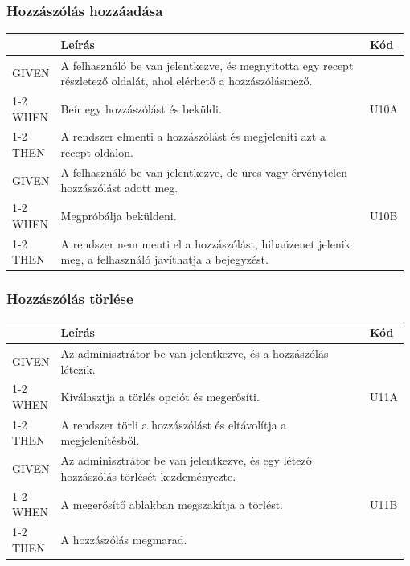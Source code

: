 \subsubsection{Hozzászólás hozzáadása}
\begin{table}[H]
	\centering
	\begin{tabular}{|m{0.12\linewidth}|m{0.78\linewidth}|m{0.08\linewidth}|}
		\hline
		& \textbf{Leírás} & \textbf{Kód} \\\hline
		GIVEN & A felhasználó be van jelentkezve, és megnyitotta egy recept részletező oldalát, ahol elérhető a hozzászólásmező. & \multirow{3}{*}{U10A} \\\cline{1-2}
		WHEN  & Beír egy hozzászólást és beküldi. & \\\cline{1-2}
		THEN  & A rendszer elmenti a hozzászólást és megjeleníti azt a recept oldalon. & \\\hline

		GIVEN & A felhasználó be van jelentkezve, de üres vagy érvénytelen hozzászólást adott meg. & \multirow{3}{*}{U10B} \\\cline{1-2}
		WHEN  & Megpróbálja beküldeni. & \\\cline{1-2}
		THEN  & A rendszer nem menti el a hozzászólást, hibaüzenet jelenik meg, a felhasználó javíthatja a bejegyzést. & \\\hline
	\end{tabular}
\end{table}

\subsubsection{Hozzászólás törlése}
\begin{table}[H]
	\centering
	\begin{tabular}{|m{0.12\linewidth}|m{0.78\linewidth}|m{0.08\linewidth}|}
		\hline
		& \textbf{Leírás} & \textbf{Kód} \\\hline
		GIVEN & Az adminisztrátor be van jelentkezve, és a hozzászólás létezik. & \multirow{3}{*}{U11A} \\\cline{1-2}
		WHEN  & Kiválasztja a törlés opciót és megerősíti. & \\\cline{1-2}
		THEN  & A rendszer törli a hozzászólást és eltávolítja a megjelenítésből. & \\\hline

		GIVEN & Az adminisztrátor be van jelentkezve, és egy létező hozzászólás törlését kezdeményezte. & \multirow{3}{*}{U11B} \\\cline{1-2}
		WHEN  & A megerősítő ablakban megszakítja a törlést. & \\\cline{1-2}
		THEN  & A hozzászólás megmarad. & \\\hline
	\end{tabular}
\end{table}

